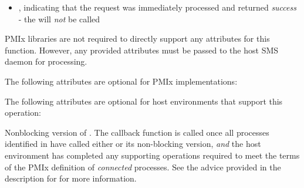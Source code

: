 \begin{arglist}
\end{arglist}

\returnsimplenb

\returnstart
\begin{itemize}
    \item {}, indicating that the request was immediately processed and returned \textit{success} - the  will \textit{not} be called
\end{itemize}
\returnend

\reqattrstart
\ac{PMIx} libraries are not required to directly support any attributes for this function. However, any provided attributes must be passed to the host \ac{SMS} daemon for processing.

\reqattrend

\optattrstart
The following attributes are optional for \ac{PMIx} implementations:



The following attributes are optional for host environments that support this operation:


\optattrend

\descr

Nonblocking version of . The callback function is called once all processes identified in  have called either  or its non-blocking version, \textit{and} the host environment has completed any supporting operations required to meet the terms of the \ac{PMIx} definition of \textit{connected} processes. See the advice provided in the description for  for more information.


\subsection{}

